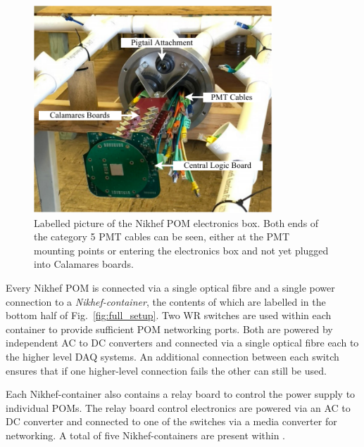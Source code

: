 \begin{figure} %
    \includegraphics[width=0.8\textwidth]{diagrams/5-daq/nikhef_plane.pdf}
    \caption[Labelled picture of the Nikhef POM electronics box.]
    {Labelled picture of the Nikhef POM electronics box. Both ends of the category 5 PMT cables
        can be seen, either at the PMT mounting points or entering the electronics box and not yet
        plugged into Calamares boards.}
    \label{fig:nikhef_plane}
\end{figure}

Every Nikhef POM is connected via a single optical fibre and a single power connection to a
\emph{Nikhef-container}, the contents of which are labelled in the bottom half of
Fig.~\ref{fig:full_setup}. Two WR switches are used within each container to provide sufficient
POM networking ports. Both are powered by independent AC to DC converters and connected via a
single optical fibre each to the higher level DAQ systems. An additional connection between each
switch ensures that if one higher-level connection fails the other can still be used.

Each Nikhef-container also contains a relay board to control the power supply to individual POMs.
The relay board control electronics are powered via an AC to DC converter and connected to one of
the switches via a media converter for networking. A total of five Nikhef-containers are present
within \chipsfive.

